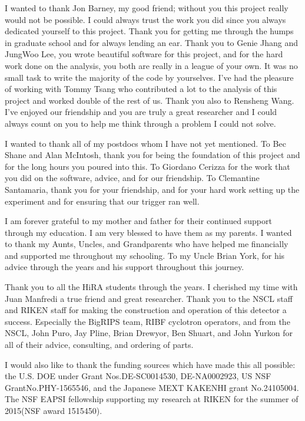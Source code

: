 \documentclass{altmsuphddissertation}
\begin{document}
\begin{acknowledgment}
I wanted to thank Jon Barney, my good friend; without you this project really would not be possible. I could always trust the work you did since you always dedicated yourself to this project. Thank you for getting me through the humps in graduate school and for always lending an ear. Thank you to Genie Jhang and JungWoo Lee, you wrote beautiful software for this project, and for the hard work done on the analysis, you both are really in a league of your own. It was no small task to write the majority of the code by yourselves. I've had the pleasure of working with Tommy Tsang who contributed a lot to the analysis of this project and worked double of the rest of us. Thank you also to Rensheng Wang. I've enjoyed our friendship and you are truly a great researcher and I could always count on you to help me think through a problem I could not solve. 

I wanted to thank all of my postdocs whom I have not yet mentioned. To Bec Shane and Alan McIntosh, thank you for being the foundation of this project and for the long hours you poured into this. To Giordano Cerizza for the work that you did on the software, advice, and for our friendship. To Clemantine Santamaria, thank you for your friendship, and for your hard work setting up the experiment and for ensuring that our trigger ran well.

I am forever grateful to my mother and father for their continued support through my education. I am very blessed to have them as my parents. I wanted to thank my Aunts, Uncles, and Grandparents who have helped me financially and supported me throughout my schooling. To my Uncle Brian York, for his advice through the years and his support throughout this journey. 

Thank you to all the HiRA students through the years. I cherished my time with Juan Manfredi a true friend and great researcher. Thank you to the NSCL staff and RIKEN staff for making the construction and operation of this detector a success. Especially the BigRIPS team, RIBF cyclotron operators, and from the NSCL, John Puro, Jay Pline, Brian Drewyor, Ben Shuart, and John Yurkon for all of their advice, consulting, and ordering of parts. 

I would also like to thank the funding sources which have made this all possible: the U.S. DOE under Grant Nos.DE-SC0014530, DE-NA0002923, US NSF GrantNo.PHY-1565546, and the Japanese MEXT KAKENHI grant No.24105004. The NSF EAPSI fellowship supporting my research at RIKEN for the summer of 2015(NSF award 1515450).

\end{acknowledgment}
\end{document}
